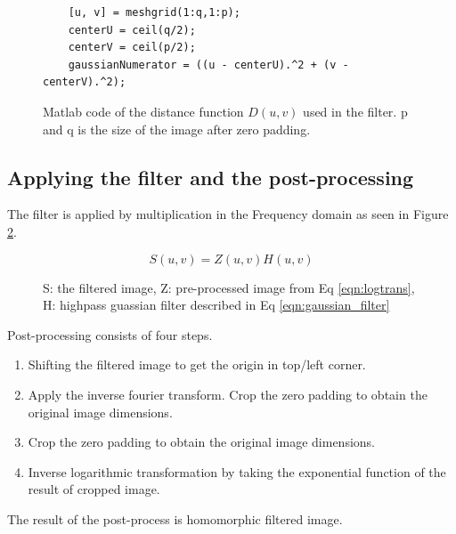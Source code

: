 \begin{figure}[h!]
  \begin{lstlisting}
    [u, v] = meshgrid(1:q,1:p);
    centerU = ceil(q/2);
    centerV = ceil(p/2);
    gaussianNumerator = ((u - centerU).^2 + (v - centerV).^2);
  \end{lstlisting}
  \caption{Matlab code of the distance function $D(u,v)$ used in the filter. p and q is the size of the image after zero padding.}
  \label{code:raduv}
\end{figure}

\subsection{Applying the filter and the post-processing}

The filter is applied by multiplication in the Frequency domain as seen in Figure \ref{fig:filteringOfImage}. 
\begin{figure}[h!]
  \begin{equation}
    S(u,v) = Z(u,v)H(u,v)
    \label{eqn:applyfilt}
  \end{equation}
  \caption{S: the filtered image, Z: pre-processed image from Eq \ref{eqn:logtrans}, H: highpass guassian filter described in Eq \ref{eqn:gaussian_filter} }
  \label{fig:filteringOfImage}    
\end{figure}

Post-processing consists of four steps.

\begin{enumerate}
  \item Shifting the filtered image to get the origin in top/left corner.
  \item Apply the inverse fourier transform. Crop the zero padding to obtain the original image dimensions.
  \item Crop the zero padding to obtain the original image dimensions.
  \item Inverse logarithmic transformation by taking the exponential function of the result of cropped image.
\end{enumerate}

The result of the post-process is homomorphic filtered image. 